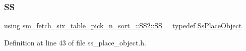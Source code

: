 \subsubsection{\texorpdfstring{SS}{SS}}
{\footnotesize\ttfamily using \hyperlink{namespacesm__fetch__six__table__pick__n__sort__1_1_1SS2_a4f1a58af7957ca6aa36b45310bbf07ab}{sm\+\_\+fetch\+\_\+six\+\_\+table\+\_\+pick\+\_\+n\+\_\+sort\+\_\+::\+S\+S2\+::\+SS} = typedef \hyperlink{structsm__fetch__six__table__pick__n__sort__1_1_1SS2_1_1SsPlaceObject}{Ss\+Place\+Object}}



Definition at line 43 of file ss\+\_\+place\+\_\+object.\+h.

